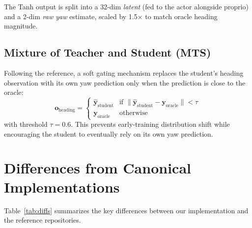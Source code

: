 \documentclass[11pt,a4paper]{article}
\begin{document}
The Tanh output is split into a 32-dim \emph{latent} (fed to the actor
alongside proprio) and a 2-dim \emph{raw yaw} estimate, scaled by 1.5$\times$
to match oracle heading magnitude.

\subsection{Mixture of Teacher and Student (MTS)}

Following the reference, a soft gating mechanism replaces the student's heading
observation with its own yaw prediction only when the prediction is close to
the oracle:
\[
  \mathbf{o}_{\mathrm{heading}} =
  \begin{cases}
    \hat{\mathbf{y}}_{\mathrm{student}} & \text{if } \|\hat{\mathbf{y}}_{\mathrm{student}} - \mathbf{y}_{\mathrm{oracle}}\| < \tau \\
    \mathbf{y}_{\mathrm{oracle}} & \text{otherwise}
  \end{cases}
\]
with threshold $\tau = 0.6$. This prevents early-training distribution shift
while encouraging the student to eventually rely on its own yaw prediction.

\section{Differences from Canonical Implementations}

Table~\ref{tab:diffs} summarizes the key differences between our implementation
and the reference repositories.
\end{document}
